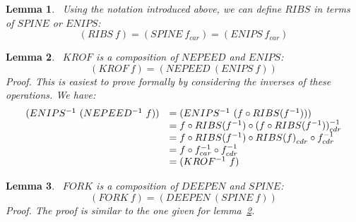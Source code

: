 \documentclass[11pt]{article} %
\newtheorem{lemma}{Lemma}
\newcommand{\eeq}{\end{equation}}
\newcommand{\beql}[1]{\begin{equation}\label{#1}}
\newcommand{\funapply}{\ensuremath{\circ}}
\begin{document}
\begin{lemma}~\label{lemma_RIBS_as_SPINE_or_ENIPS}
\normalfont
Using the notation introduced above, we can define $RIBS$ in terms of $SPINE$ or $ENIPS$:
\beql{RIBS_as_SPINE_or_ENIPS}
(RIBS~f) = (SPINE~f_{car}) = (ENIPS~f_{car})
\eeq

\end{lemma}

\begin{lemma}~\label{lemma_KROF_as_NEPEED_and_ENIPS}
\normalfont
$KROF$ is a composition of $NEPEED$ and $ENIPS$:
\beql{KROF_as_NEPEED_and_ENIPS}
(KROF~f) = (NEPEED~(ENIPS~f))
\eeq
\textit{Proof}.
This is easiest to prove formally by considering the inverses
of these operations. We have:
\beql{KROFINV_as_ENIPSINV_and_NEPEEDINV}
\begin{array}{l l}
(ENIPS^{-1}~(NEPEED^{-1}~f)) & = (ENIPS^{-1}~(f \funapply RIBS(f^{-1}))) \\
     & = f \funapply RIBS(f^{-1}) \funapply (f \funapply RIBS(f^{-1}))^{-1}_{cdr} \\
     & = f \funapply RIBS(f^{-1}) \funapply {RIBS(f)}_{cdr} \funapply f^{-1}_{cdr} \\
     & = f \funapply f^{-1}_{car} \funapply f^{-1}_{cdr} \\
     & = (KROF^{-1}~f) \\
\end{array}
\eeq
\end{lemma}

\begin{lemma}~\label{lemma_FORK_as_DEEPEN_and_SPINE}
\normalfont
$FORK$ is a composition of $DEEPEN$ and $SPINE$:
\beql{FORK_as_DEEPEN_and_SPINE}
(FORK~f) = (DEEPEN~(SPINE~f))
\eeq
\textit{Proof}.
The proof is similar to the one given for lemma~\ref{lemma_KROF_as_NEPEED_and_ENIPS}. %
\end{lemma}
\end{document}
